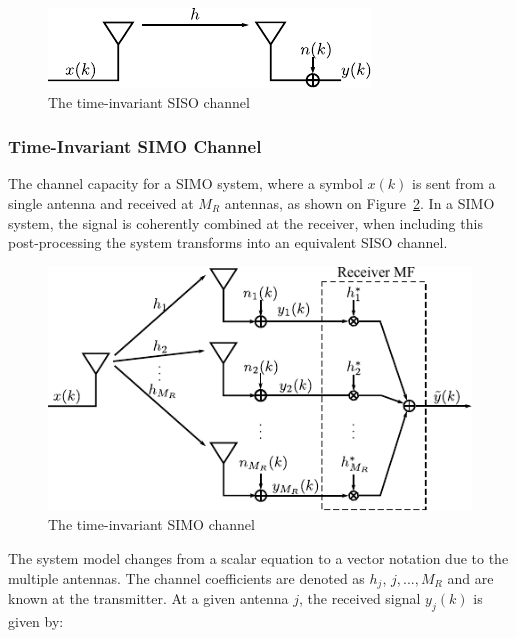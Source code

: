 \begin{figure}[hbp]
  \centering
  \includegraphics[scale=1.2]{img/analysis/sisoModel}
  \caption{The time-invariant SISO channel}
  \label{fig:sisoModel}
\end{figure}


\subsubsection{Time-Invariant SIMO Channel}
The channel capacity for a SIMO system, where a symbol $x(k)$ is sent from a single antenna and received at $M_R$ antennas, as shown on Figure~\ref{fig:simoModel}. In a SIMO system, the signal is coherently combined at the receiver, when including this post-processing the system transforms into an equivalent SISO channel\cite{Tim2012Practical}. 
\begin{figure}[htbp]
  \centering
  \includegraphics[scale=1.2]{img/analysis/simoModel}
  \caption{The time-invariant SIMO channel}
  \label{fig:simoModel}
\end{figure}

The system model changes from a scalar equation to a vector notation due to the multiple antennas. The channel coefficients are denoted as $h_j$, $j,...,M_R$ and are known at the transmitter. At a given antenna $j$, the received signal $y_j(k)$ is given by: 

